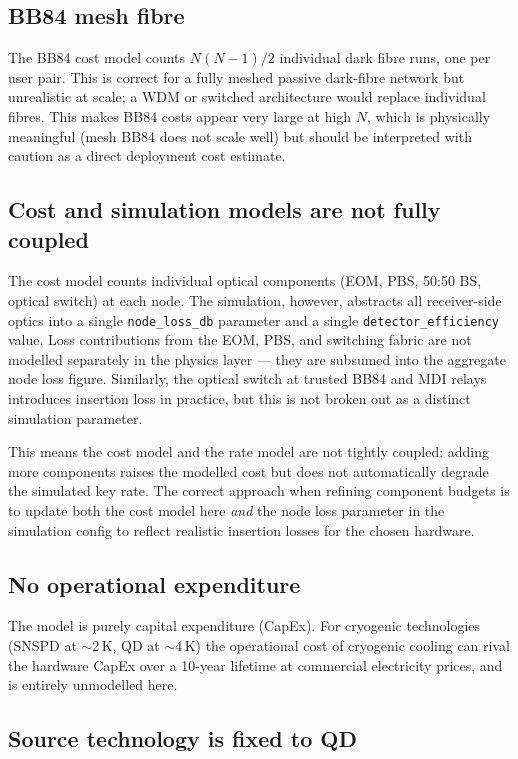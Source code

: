 \documentclass[12pt,a4paper]{article}
\begin{document}
\subsection{BB84 mesh fibre}

The BB84 cost model counts $N(N{-}1)/2$ individual dark fibre runs, one per
user pair. This is correct for a fully meshed passive dark-fibre network but
unrealistic at scale; a WDM or switched architecture would replace individual
fibres. This makes BB84 costs appear very large at high $N$, which is physically
meaningful (mesh BB84 does not scale well) but should be interpreted with caution
as a direct deployment cost estimate.

\subsection{Cost and simulation models are not fully coupled}

The cost model counts individual optical components (EOM, PBS, 50:50 BS,
optical switch) at each node. The simulation, however, abstracts all
receiver-side optics into a single \texttt{node\_loss\_db} parameter and a
single \texttt{detector\_efficiency} value. Loss contributions from the EOM,
PBS, and switching fabric are not modelled separately in the physics layer ---
they are subsumed into the aggregate node loss figure. Similarly, the optical
switch at trusted BB84 and MDI relays introduces insertion loss in practice,
but this is not broken out as a distinct simulation parameter.

This means the cost model and the rate model are not tightly coupled: adding
more components raises the modelled cost but does not automatically degrade
the simulated key rate. The correct approach when refining component budgets
is to update both the cost model here \emph{and} the node loss parameter in
the simulation config to reflect realistic insertion losses for the chosen
hardware.

\subsection{No operational expenditure}

The model is purely capital expenditure (CapEx). For cryogenic technologies
(SNSPD at $\sim$2\,K, QD at $\sim$4\,K) the operational cost of cryogenic
cooling can rival the hardware CapEx over a 10-year lifetime at commercial
electricity prices, and is entirely unmodelled here.

\subsection{Source technology is fixed to QD}
\end{document}
